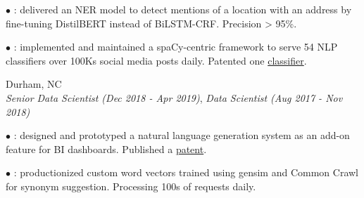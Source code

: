 \documentclass[resmargin]{resume_style_class} %
\newenvironment{outline}
  {\begin{list}{}{\setlength{\leftmargin}{30pt}\setlength\itemsep{-2pt}}}
  {\end{list}}
\newenvironment{outline-cond}
  {\begin{list}{}{
  \setlength{\leftmargin}{30pt}
  \setlength\topsep{-10pt}
  \setlength\itemindent{-30pt}
  }}
  {\end{list}}
\begin{document}
\begin{resume}
\begin{outline}
	\item[$\bullet$\hspace{0.1cm}] : delivered an NER model to detect mentions of a location with an address by fine-tuning DistilBERT instead of BiLSTM-CRF. Precision > 95\%. 
	\item[$\bullet$\hspace{0.1cm}]  : implemented and maintained a spaCy-centric framework to serve 54 NLP classifiers over 100Ks social media posts daily. Patented one \href{https://image-ppubs.uspto.gov/dirsearch-public/print/downloadPdf/11586739}{classifier}.
\end{outline} 

\begin{large}  \end{large} \hfill Durham, NC
\vspace{5pt} \\
\textit{Senior Data Scientist (Dec 2018 - Apr 2019)}, \textit{Data Scientist (Aug 2017 - Nov 2018)}
\vspace{2pt}
\begin{outline}
	\item[$\bullet$\hspace{0.1cm}] : designed and prototyped a natural language generation system as an add-on feature for BI dashboards. Published a  \href{https://image-ppubs.uspto.gov/dirsearch-public/print/downloadPdf/20220414324}{patent}.
	\item[$\bullet$\hspace{0.1cm}] : productionized custom word vectors trained using gensim and Common Crawl for synonym suggestion. Processing 100s of requests daily.
\end{outline} 




\end{resume}
\end{document}
